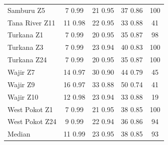 \documentclass[review]{elsarticle}
\begin{document}
\begin{table}
\begin{tabular}{l|ccc|c}
		Samburu Z5 & 7 	0.99 	& 	21 	0.95 	& 	37 	0.86 & 100	\\
		Tana River Z11& 11 	0.98 	& 	22 	0.95 	& 	33 	0.88 & 41	\\
		Turkana Z1 & 7 	0.99 	& 	20 	0.95 	& 	35 	0.87 & 98 		\\
		Turkana Z3 & 7 	0.99 	& 	23 	0.94 	& 	40 	0.83	& 100	\\
		Turkana Z24 & 7 	0.99 	& 	20 	0.95 	& 	35 	0.87	& 100	 \\
		Wajir Z7 & 14 	0.97 	& 	30 	0.90 	& 	44 	0.79 & 45	\\
		Wajir Z9 & 16 	0.97 	& 	33 	0.88 	& 	50 	0.74 & 41	\\
		Wajir Z10& 12 	0.98 	& 	23 	0.94 	& 	33 	0.88 & 19	\\
		West Pokot Z1 & 7 	0.99 	& 	21 	0.95 	& 	38 	0.85 & 100		\\
		West Pokot Z24 & 9 	0.99 	& 	22 	0.94 	& 	36 	0.86 & 94		\\
		\bottomrule
		Median & 11 0.99 & 23 0.95 & 38 0.85 & 93\\
		\bottomrule
	\end{tabular}
\end{table}
\end{document}
